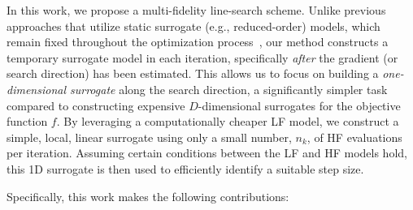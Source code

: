 \documentclass[10pt]{article} %
\numberwithin{equation}{section}
\theoremstyle{plain}
\theoremstyle{definition}
\newcommand{\<}{\langle}
\renewcommand{\>}{\rangle}
\renewcommand{\(}{\left(}
\renewcommand{\)}{\right)}
\renewcommand{\[}{\left[}
\renewcommand{\]}{\right]}
\begin{document}
In this work, we propose a multi-fidelity line-search scheme. Unlike previous approaches that utilize static surrogate (e.g., reduced-order) models, which remain fixed throughout the optimization process~\citep{yue2013accelerating, grundvig2023line}, our method constructs a temporary surrogate model in each iteration, specifically \emph{after} the gradient (or search direction) has been estimated. This allows us to focus on building a \emph{one-dimensional surrogate} along the search direction, a significantly simpler task compared to constructing expensive $D$-dimensional surrogates for the objective function $f$. By leveraging a computationally cheaper LF model, we construct a simple, local, linear surrogate using only a small number, $n_k$, of HF evaluations per iteration. Assuming certain conditions between the LF and HF models hold, this 1D surrogate is then used to efficiently identify a suitable step size.


Specifically, this work makes the following contributions:
\end{document}

